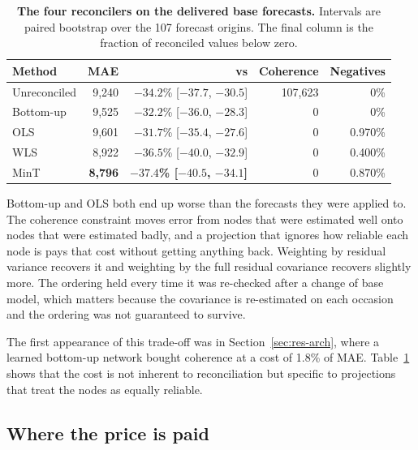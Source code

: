 \begin{table}[htp]
\centering
\begin{tabular}{lrrrr}
\toprule
{\bf Method} & {\bf MAE} & {\bf vs \naiveA{}} & {\bf Coherence} & {\bf Negatives} \\
\midrule
Unreconciled & 9,240 & $-34.2$\% [$-37.7$, $-30.5$] & 107,623 & 0\% \\
Bottom-up & 9,525 & $-32.2$\% [$-36.0$, $-28.3$] & 0 & 0\% \\
OLS & 9,601 & $-31.7$\% [$-35.4$, $-27.6$] & 0 & 0.970\% \\
WLS & 8,922 & $-36.5$\% [$-40.0$, $-32.9$] & 0 & 0.400\% \\
MinT & {\bf 8,796} & {\bf $-37.4$\% [$-40.5$, $-34.1$]} & 0 & 0.870\% \\
\bottomrule
\end{tabular}
\caption[Four reconcilers]{\textbf{The four reconcilers on the delivered base forecasts.}
Intervals are paired bootstrap over the 107 forecast origins. The final column is the
fraction of reconciled values below zero.}
\label{tab:recon}
\end{table}

Bottom-up and OLS both end up worse than the forecasts they were applied to. The coherence
constraint moves error from nodes that were estimated well onto nodes that were estimated
badly, and a projection that ignores how reliable each node is pays that cost without
getting anything back. Weighting by residual variance recovers it and weighting by the full
residual covariance recovers slightly more. The ordering held every time it was re-checked
after a change of base model, which matters because the covariance is re-estimated on each
occasion and the ordering was not guaranteed to survive.

The first appearance of this trade-off was in Section~\ref{sec:res-arch}, where a learned
bottom-up network bought coherence at a cost of 1.8\% of MAE. Table~\ref{tab:recon} shows
that the cost is not inherent to reconciliation but specific to projections that treat the
nodes as equally reliable.

\subsection{Where the price is paid}

